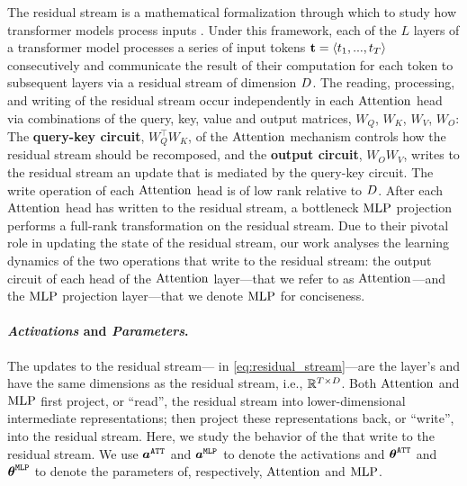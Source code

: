 The residual stream is a mathematical formalization through which to study how transformer models process inputs \citep{elhage2021mathematical}. Under this framework, each of the $L$ layers of a transformer model processes a series of input tokens $\boldsymbol{\mathrm{t}} = \langle t_1, ..., t_T\rangle$ consecutively and communicate the result of their computation for each token to subsequent layers via a residual stream of dimension $D$. 
The reading, processing, and writing of the residual stream occur independently in each $\mathrm{Attention}$ head via combinations of the query, key, value and output matrices, $W_Q$, $W_K$, $W_V$, $W_O$: The \textbf{query-key circuit}, $W_Q^{\top}W_K$, of the $\mathrm{Attention}$ mechanism controls how the residual stream should be recomposed, and the \textbf{output circuit}, $W_OW_V$, writes to the residual stream an update that is mediated by the query-key circuit. The write operation of each $\mathrm{Attention}$ head is of low rank relative to $D$. After each $\mathrm{Attention}$ head has written to the residual stream, a bottleneck $\mathrm{MLP}$ projection performs a full-rank transformation on the residual stream.  Due to their pivotal role in updating the state of the residual stream, our work analyses the learning dynamics of the two operations that write to the residual stream: the output circuit of each head of the $\mathrm{Attention}$ layer---that we refer to as $\mathrm{Attention}$---and the $\mathrm{MLP}$ projection layer---that we denote $\mathrm{MLP}$ for conciseness.


\paragraph{\textit{Activations} and \textit{Parameters}.}
The updates to the residual stream--- in \cref{eq:residual_stream}---are the layer's  and have the same dimensions as the residual stream, i.e., $\mathbb{R}^{\mathop{T\times D}}$. Both $\mathrm{Attention}$ and $\mathrm{MLP}$ first project, or \enquote{read}, the residual stream into lower-dimensional intermediate representations; then project these representations back, or \enquote{write}, into the residual stream. Here, we study the behavior of the  that write to the residual stream.
We use $\boldsymbol{a}^{\mathtt{ATT}}$ and $\boldsymbol{a}^{\mathtt{MLP}}$ to denote the activations and $\boldsymbol{\theta}^{\mathtt{ATT}}$ and $\boldsymbol{\theta}^{\mathtt{MLP}}$ to denote the parameters of, respectively, $\mathrm{Attention}$ and $\mathrm{MLP}$.

